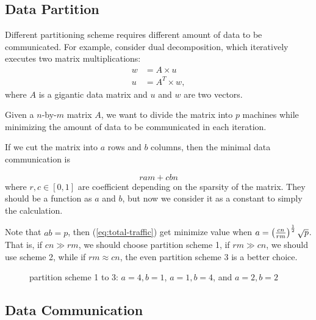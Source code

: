 \documentclass{acm_proc_article-sp}
\begin{document}
\subsection{Data Partition}
Different partitioning scheme requires different amount of data to be
communicated. For example, consider dual decomposition,
which iteratively executes two matrix multiplications:
\begin{align*}
w &= A \times u \\
u &= A^T \times w,
\end{align*}
where $A$ is a gigantic data matrix and $u$ and $w$ are two vectors.

Given a $n$-by-$m$ matrix $A$, we want to divide the matrix into $p$ machines
while minimizing the amount of data to be communicated in each iteration.

If we cut the matrix into $a$ rows and $b$ columns, then the minimal data
communication is

\begin{equation}
  r  am +  c bn
  \label{eq:total-traffic}
\end{equation}
where $r,c \in [0,1]$ are coefficient depending on the sparsity of the
matrix. They should be a function as $a$ and $b$, but now we consider it as a
constant to simply the calculation.

Note that $ab=p$, then (\ref{eq:total-traffic}) get minimize value when
$a = \left( \frac{cn}{rm} \right)^{\frac{1}{2}}\sqrt{p}$. That is, if $cn \gg rm$, we
should choose partition scheme 1, if $rm \gg cn$, we should use scheme 2, while
if $rm \approx cn$, the even partition scheme 3 is a better choice.

\begin{figure}[th!]
  \centering
{}
  \caption{partition scheme 1 to 3: $a=4,b=1$, $a=1,b=4$, and $a=2,b=2$}
\end{figure}


\subsection{Data Communication}
\end{document}
